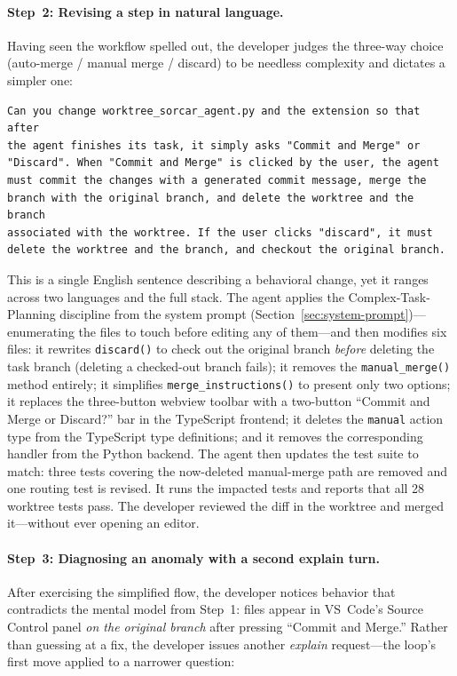\documentclass{article}
\begin{document}
\paragraph{Step~2: Revising a step in natural language.}
Having seen the workflow spelled out, the developer judges the
three-way choice (auto-merge / manual merge / discard) to be needless
complexity and dictates a simpler one:

\begin{lstlisting}[style=prompt]
Can you change worktree_sorcar_agent.py and the extension so that after
the agent finishes its task, it simply asks "Commit and Merge" or
"Discard". When "Commit and Merge" is clicked by the user, the agent
must commit the changes with a generated commit message, merge the
branch with the original branch, and delete the worktree and the branch
associated with the worktree. If the user clicks "discard", it must
delete the worktree and the branch, and checkout the original branch.
\end{lstlisting}

\noindent This is a single English sentence describing a behavioral
change, yet it ranges across two languages and the full stack.
The agent applies the Complex-Task-Planning discipline from the system
prompt (Section~\ref{sec:system-prompt})---enumerating the files to
touch before editing any of them---and then modifies six files:
it rewrites \texttt{discard()} to check out the original branch
\emph{before} deleting the task branch (deleting a checked-out branch
fails); it removes the \texttt{manual\_merge()} method entirely;
it simplifies \texttt{merge\_instructions()} to present only two
options; it replaces the three-button webview toolbar with a
two-button ``Commit and Merge or Discard?'' bar in the TypeScript
frontend; it deletes the \texttt{manual} action type from the
TypeScript type definitions; and it removes the corresponding handler
from the Python backend.
The agent then updates the test suite to match: three tests covering
the now-deleted manual-merge path are removed and one routing test is
revised.
It runs the impacted tests and reports that all 28 worktree tests pass.
The developer reviewed the diff in the worktree and merged it---without
ever opening an editor.

\paragraph{Step~3: Diagnosing an anomaly with a second explain turn.}
After exercising the simplified flow, the developer notices behavior
that contradicts the mental model from Step~1: files appear in
VS~Code's Source Control panel \emph{on the original branch} after
pressing ``Commit and Merge.''
Rather than guessing at a fix, the developer issues another
\emph{explain} request---the loop's first move applied to a narrower
question:
\end{document}
